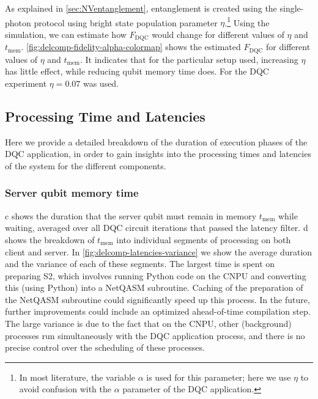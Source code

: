 As explained in \cref{sec:NVentanglement}, entanglement is created using the single-photon protocol using bright state population parameter $\eta$.\footnote{In most literature, the variable $\alpha$ is used for this parameter; here we use $\eta$ to avoid confusion with the $\alpha$ parameter of the \ac{DQC} application.} Using the simulation, we can estimate how $F_{\text{DQC}}$ would change for different values of $\eta$ and $t_{\text{mem}}$. \cref{fig:delcomp-fidelity-alpha-colormap} shows the estimated $F_{\text{DQC}}$ for different values of $\eta$ and $t_{\text{mem}}$. It indicates that for the particular setup used, increasing $\eta$ has little effect, while reducing qubit memory time does. For the \ac{DQC} experiment $\eta = 0.07$ was used.

\subsection{Processing Time and Latencies}
\label{sec:processing_time_latencies}

Here we provide a detailed breakdown of the duration of execution phases of the \ac{DQC} application, in order to gain insights into the processing times and latencies of the system for the different components.

\subsubsection{Server qubit memory time}
\label{sec:server-qubit-memory-time}

c shows the duration that the server qubit must remain in memory $t_{\text{mem}}$ while waiting, averaged over all \ac{DQC} circuit iterations that passed the latency filter. d shows the breakdown of $t_{\text{mem}}$ into individual segments of processing on both client and server. In \cref{fig:delcomp-latencies-variance} we show the average duration and the variance of each of these segments. The largest time is spent on preparing S2, which involves running Python code on the \ac{CNPU} and converting this (using Python) into a \ac{NetQASM} subroutine. Caching of the preparation of the \ac{NetQASM} subroutine could significantly speed up this process. In the future, further improvements could include an optimized ahead-of-time compilation step. The large variance is due to the fact that on the \ac{CNPU}, other (background) processes run simultaneously with the \ac{DQC} application process, and there is no precise control over the scheduling of these processes.

